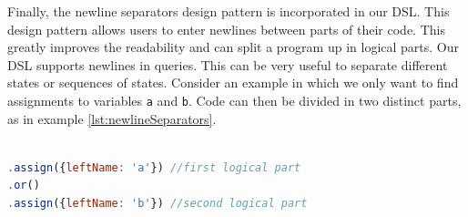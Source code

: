 Finally, the newline separators design pattern is incorporated in our DSL. This design pattern allows users to enter newlines between parts of their code. This greatly improves the readability and can split a program up in logical parts. Our DSL supports newlines in queries. This can be very useful to separate different states or sequences of states. Consider an example in which we only want to find assignments to variables \texttt{a} and \texttt{b}. Code can then be divided in two distinct parts, as in example \ref{lst:newlineSeparators}.

\begin{lstlisting}[label={lst:newlineSeparators},language=JavaScript,caption=Newline separators,mathescape=true]  % float=t?

.assign({leftName: 'a'}) //first logical part
.or()
.assign({leftName: 'b'}) //second logical part
\end{lstlisting}


